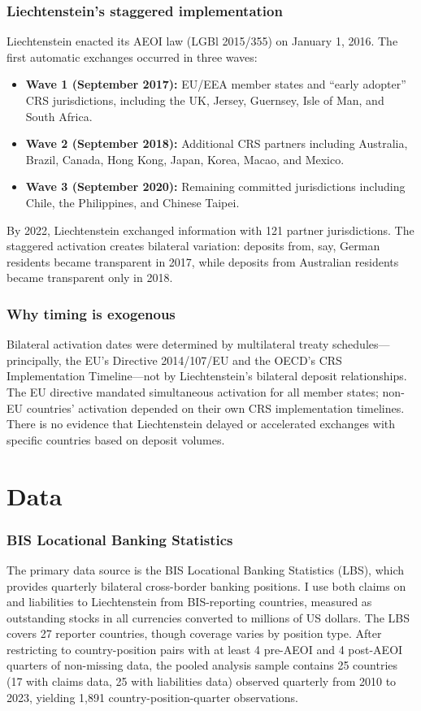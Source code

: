 \documentclass[12pt]{article}
\begin{document}
\subsubsection*{Liechtenstein's staggered implementation} Liechtenstein enacted its AEOI law (LGBl 2015/355) on January 1, 2016. The first automatic exchanges occurred in three waves:

\begin{itemize}
  \item \textbf{Wave 1 (September 2017):} EU/EEA member states and ``early adopter'' CRS jurisdictions, including the UK, Jersey, Guernsey, Isle of Man, and South Africa.
  \item \textbf{Wave 2 (September 2018):} Additional CRS partners including Australia, Brazil, Canada, Hong Kong, Japan, Korea, Macao, and Mexico.
  \item \textbf{Wave 3 (September 2020):} Remaining committed jurisdictions including Chile, the Philippines, and Chinese Taipei.
\end{itemize}

By 2022, Liechtenstein exchanged information with 121 partner jurisdictions. The staggered activation creates bilateral variation: deposits from, say, German residents became transparent in 2017, while deposits from Australian residents became transparent only in 2018.

\subsubsection*{Why timing is exogenous} Bilateral activation dates were determined by multilateral treaty schedules---principally, the EU's Directive 2014/107/EU and the OECD's CRS Implementation Timeline---not by Liechtenstein's bilateral deposit relationships. The EU directive mandated simultaneous activation for all member states; non-EU countries' activation depended on their own CRS implementation timelines. There is no evidence that Liechtenstein delayed or accelerated exchanges with specific countries based on deposit volumes.

\section{Data}

\subsubsection*{BIS Locational Banking Statistics} The primary data source is the BIS Locational Banking Statistics (LBS), which provides quarterly bilateral cross-border banking positions. I use both claims on and liabilities to Liechtenstein from BIS-reporting countries, measured as outstanding stocks in all currencies converted to millions of US dollars. The LBS covers 27 reporter countries, though coverage varies by position type. After restricting to country-position pairs with at least 4 pre-AEOI and 4 post-AEOI quarters of non-missing data, the pooled analysis sample contains 25 countries (17 with claims data, 25 with liabilities data) observed quarterly from 2010 to 2023, yielding 1,891 country-position-quarter observations.
\end{document}
